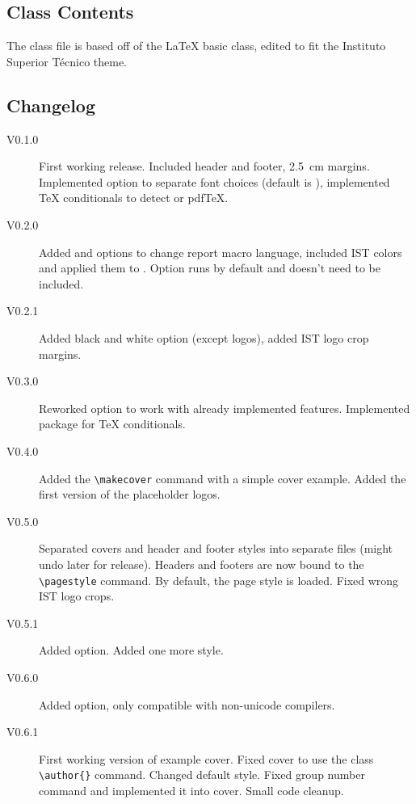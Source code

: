\subsection{Class Contents}

The class file is based off of the \LaTeX{} basic  class, edited to fit the Instituto Superior Técnico theme.

\subsection{Changelog}

\begin{description}
	\item[V0.1.0] First working release. Included header and footer, \SI{2.5}{\centi\meter} margins. Implemented  option to separate font choices (default is ), implemented \TeX{} conditionals to detect \XeTeX{} or pdf\TeX{}.
	\item[V0.2.0] Added  and  options to change report macro language, included IST colors and applied them to . Option  runs by default and doesn't need to be included.
	\item[V0.2.1] Added black and white option (except logos), added IST logo crop margins.
	\item[V0.3.0] Reworked  option to work with already implemented features. Implemented  package for \TeX{} conditionals.
	\item[V0.4.0] Added the \verb|\makecover| command with a simple cover example. Added the first version of the placeholder logos.
	\item[V0.5.0] Separated covers and header and footer styles into separate files (might undo later for release). Headers and footers are now bound to the \verb|\pagestyle| command. By default, the  page style is loaded. Fixed wrong IST logo crops.
	\item[V0.5.1] Added  option. Added one more style.
	\item[V0.6.0] Added  option, only compatible with non-unicode compilers.
	\item[V0.6.1] First working version of example cover. Fixed cover to use the  class \verb|\author{}| command. Changed default style. Fixed group number command and implemented it into cover. Small code cleanup.
\end{description}
